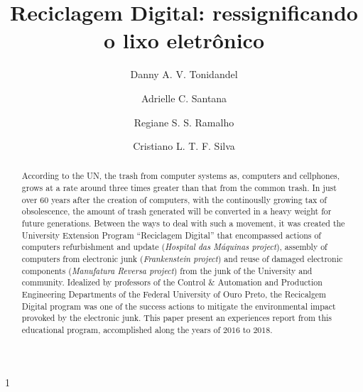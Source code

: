 \documentclass[a4paper]{ifacconf}
\def\portugues{1}
\def\portugues{0}
\begin{document}
	
\if\portugues1

% 
	
\begin{frontmatter}

\title{Reciclagem Digital: ressignificando o lixo eletrônico}

\author[1]{Danny A. V. Tonidandel}
\author[1]{Adrielle C. Santana}
\author[1]{Regiane S. S. Ramalho}
\author[2]{Cristiano L. T. F. Silva}

\address[1]{Universidade Federal de Ouro Preto \\ Departamento de Eng. de Controle $\&$ Automação \\ Ouro Preto, MG, Brasil (e-mails: tonidandel@ufop.edu.br, adrielle@ufop.edu.br, regiane@ufop.edu.br)}

\address[2]{Universidade Federal de Ouro Preto\\ Departamento de Eng. de Produção \\ Ouro Preto, MG, Brasil (e-mail: cristiano.silva@ufop.edu.br)}


\renewcommand{\abstractname}{{\bf Abstract:~}}
\begin{abstract}                %
According to the UN, the trash from computer systems as, computers and cellphones, grows at a rate around three times greater than that from the common trash. In just over $60$ years after the creation of computers, with the continouslly growing tax of obsolescence, the amount of trash generated will be converted in a heavy weight for future generations. Between the ways to deal with such a movement, it was created the University Extension Program ``Reciclagem Digital'' that encompassed actions of computers refurbishment and update (\emph{Hospital das Máquinas project}), assembly of computers from electronic junk (\emph{Frankenstein project}) and reuse of damaged electronic components (\emph{Manufatura Reversa project}) from the junk of the University and community. Idealized by professors of the Control $\&$ Automation and Production Engineering Departments of the Federal University of Ouro Preto, the Recicalgem Digital program was one of the success actions to mitigate the environmental impact provoked by the electronic junk. This paper present an experiences report from this educational program, accomplished along the years of $2016$ to $2018$.


\end{abstract}
\end{frontmatter}
\end{document}
